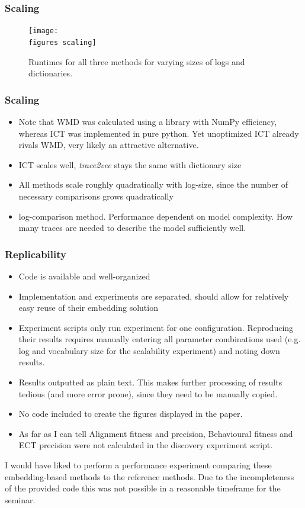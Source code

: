 \documentclass{beamer}
\newcommand{\figures}{../figures/}
\newcommand{\pro}{\item[\color{green}\textbf{+}\color{black}]}
\newcommand{\con}{\item[\color{red}\boldmath{$-$}\color{black}]}
\begin{document}
	
	\begin{frame}
		\frametitle{Scaling}
		\begin{figure}
			\texttt{[image: \\figures scaling]}
			\caption{Runtimes for all three methods for varying sizes of logs and dictionaries.}
			\label{fig:scalability}
		\end{figure}
	\end{frame}
	
	
	\begin{frame}
		\frametitle{Scaling}
		\begin{itemize}
			\item Note that WMD was calculated using a library with NumPy efficiency, whereas ICT was implemented in pure python. Yet unoptimized ICT already rivals WMD, very likely an attractive alternative.
			\item ICT scales well, \emph{trace2vec} stays the same with dictionary size
			\item All methods scale roughly quadratically with log-size, since the number of necessary comparisons grows quadratically
			\item log-comparison method. Performance dependent on model complexity. How many traces are needed to describe the model sufficiently well.
		\end{itemize}
	\end{frame}
	
	\begin{frame}
		\frametitle{Replicability}
		\begin{itemize}
			 \pro<1-> Code  is available and well-organized
			 \pro<2-> Implementation and experiments are separated, should allow for relatively easy reuse of their embedding solution
			 \con<3-> Experiment scripts only run experiment for one configuration. Reproducing their results requires manually entering all parameter combinations used (e.g. log and vocabulary size for the scalability experiment) and noting down results.
			 \con<4-> Results outputted as plain text. This makes further processing of results tedious (and more error prone), since they need to be manually copied.
			 \con<5-> No code included to create the figures displayed in the paper.
			 \con<6-> As far as I can tell Alignment fitness and precision, Behavioural fitness and ECT precision were not calculated in the discovery experiment script.
		\end{itemize}
	\alert<7->{I would have liked to perform a performance experiment comparing these embedding-based methods to the reference methods. Due to the incompleteness of the provided code this was not possible in a reasonable timeframe for the seminar.}
	\end{frame}
	
\end{document}
